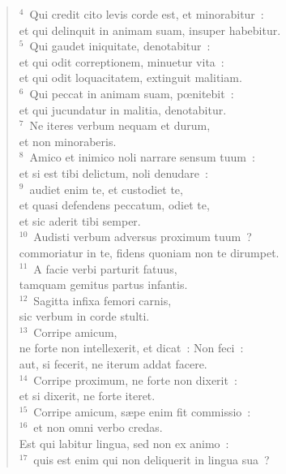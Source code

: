 \begin{flushleft}\begin{verse}${}^{4}$~Qui credit cito levis corde est, et minorabitur~:\\ et qui delinquit in animam suam, insuper habebitur.\\
${}^{5}$~Qui gaudet iniquitate, denotabitur~:\\ et qui odit correptionem, minuetur vita~:\\ et qui odit loquacitatem, extinguit malitiam.\\
${}^{6}$~Qui peccat in animam suam, pœnitebit~:\\ et qui jucundatur in malitia, denotabitur.\\
${}^{7}$~Ne iteres verbum nequam et durum,\\ et non minoraberis.\\
${}^{8}$~Amico et inimico noli narrare sensum tuum~:\\ et si est tibi delictum, noli denudare~:\\
${}^{9}$~audiet enim te, et custodiet te,\\ et quasi defendens peccatum, odiet te,\\ et sic aderit tibi semper.\\
${}^{10}$~Audisti verbum adversus proximum tuum~?\\ commoriatur in te, fidens quoniam non te dirumpet.\\
${}^{11}$~A facie verbi parturit fatuus,\\ tamquam gemitus partus infantis.\\
${}^{12}$~Sagitta infixa femori carnis,\\ sic verbum in corde stulti.\\
${}^{13}$~Corripe amicum,\\ ne forte non intellexerit, et dicat~: Non feci~:\\ aut, si fecerit, ne iterum addat facere.\\
${}^{14}$~Corripe proximum, ne forte non dixerit~:\\ et si dixerit, ne forte iteret.\\
${}^{15}$~Corripe amicum, s\ae pe enim fit commissio~:\\
${}^{16}$~et non omni verbo credas.\\ Est qui labitur lingua, sed non ex animo~:\\
${}^{17}$~quis est enim qui non deliquerit in lingua sua~?\end{verse}\end{flushleft}

